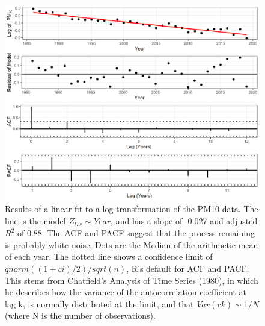 \documentclass{article}
\begin{document}
\begin{figure}[ht]
	\centering
	\includegraphics[width = \textwidth]{Figures/explore_ts_exp_fit.png}
	\caption{Results of a linear fit to a log transformation of the PM10 data.  The line is the model $Z_{t,s} \sim Year$, and has a slope of -0.027 and adjusted $R^2$ of 0.88.  The \ac{ACF} and \ac{PACF} suggest that the process remaining is probably white noise.  Dots are the Median of the arithmetic mean of each year.  The dotted line shows a confidence limit of $qnorm((1 + ci)/2)/sqrt(n)$, R's default for ACF and PACF.  This stems from Chatfield's Analysis of Time Series (1980), in which he describes how the variance of the autocorrelation coefficient at lag k, is normally distributed at the limit, and that $Var(rk) \sim 1/N$ (where N is the number of observations).}
	\label{fig:explore_ts_exp_fit}
\end{figure}
\end{document}
